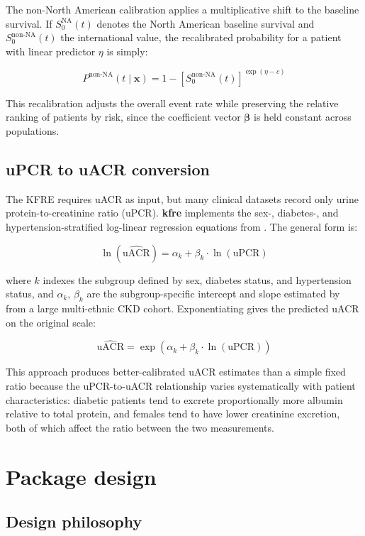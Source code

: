 The non-North American calibration applies a multiplicative shift to the
baseline survival. If \(S_0^{\text{NA}}(t)\) denotes the North American
baseline survival and \(S_0^{\text{non-NA}}(t)\) the international value,
the recalibrated probability for a patient with linear predictor \(\eta\) is
simply:

\[
P^{\text{non-NA}}(t \mid \mathbf{x}) =
1 - \left[S_0^{\text{non-NA}}(t)\right]^{\exp(\eta - c)}
\]

This recalibration adjusts the overall event rate while preserving the
relative ranking of patients by risk, since the coefficient vector
\(\boldsymbol{\beta}\) is held constant across populations.

\subsection{uPCR to uACR conversion}\label{upcr-to-uacr-conversion}

The KFRE requires uACR as input, but many clinical datasets record only
urine protein-to-creatinine ratio (uPCR). \textbf{kfre} implements the
sex-, diabetes-, and hypertension-stratified log-linear regression equations
from \citet{sumida2020}. The general form is:

\[
\ln(\hat{\text{uACR}}) = \alpha_k + \beta_k \cdot \ln(\text{uPCR})
\]

where \(k\) indexes the subgroup defined by sex, diabetes status, and
hypertension status, and \(\alpha_k\), \(\beta_k\) are the subgroup-specific
intercept and slope estimated by \citet{sumida2020} from a large multi-ethnic CKD
cohort. Exponentiating gives the predicted uACR on the original scale:

\[
\hat{\text{uACR}} = \exp\!\left(\alpha_k + \beta_k \cdot \ln(\text{uPCR})\right)
\]

This approach produces better-calibrated uACR estimates than a simple fixed
ratio because the uPCR-to-uACR relationship varies systematically with
patient characteristics: diabetic patients tend to excrete proportionally
more albumin relative to total protein, and females tend to have lower
creatinine excretion, both of which affect the ratio between the two
measurements.

\section{Package design}\label{package-design}

\subsection{Design philosophy}\label{design-philosophy}

